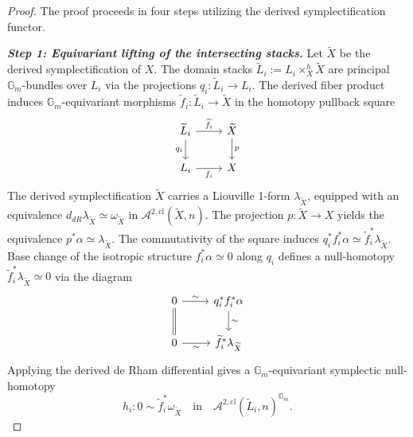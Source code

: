 \documentclass[reqno]{amsart}
\theoremstyle{definition}
\theoremstyle{remark}
\newcommand{\Gm}{\mathbb{G}_m}
\newcommand{\Acl}{\mathcal{A}^{2, \mathrm{cl}}}
\begin{document}
{\begin{proof}
  The proof proceeds in four steps utilizing the derived symplectification functor.

  \vspace{5pt}

  \textbf{\textit{Step 1: Equivariant lifting of the intersecting stacks.}}
  Let $\widetilde{X}$ be the derived symplectification of $X$. The domain stacks $\widetilde{L}_i := L_i \times_X^h \widetilde{X}$ are principal $\Gm$-bundles over $L_i$ via the projections $q_i \colon \widetilde{L}_i \to L_i$. The derived fiber product induces $\Gm$-equivariant morphisms $\widetilde{f}_i \colon \widetilde{L}_i \to \widetilde{X}$ in the homotopy pullback square
  \[
    \begin{tikzcd}
      \widetilde{L}_i \arrow[r, "\widetilde{f}_i"] \arrow[d, "q_i"'] &
      \widetilde{X} \arrow[d, "p"] \\
      L_i \arrow[r, "f_i"'] & X
    \end{tikzcd}
  \]
The derived symplectification $\widetilde{X}$ carries a Liouville 1-form $\lambda_{\widetilde{X}}$, equipped with an equivalence $d_{dR}\lambda_{\widetilde{X}} \simeq \omega_{\widetilde{X}}$ in $\Acl(\widetilde{X}, n)$. The projection $p \colon \widetilde{X} \to X$ yields the equivalence $p^*\alpha \simeq \lambda_{\widetilde{X}}$. 
The commutativity of the square induces $q_i^* f_i^* \alpha \simeq \widetilde{f}_i^* \lambda_{\widetilde{X}}$. Base change of the isotropic structure $f_i^*\alpha \simeq 0$ along $q_i$ defines a null-homotopy $\widetilde{f}_i^*\lambda_{\widetilde{X}} \simeq 0$ via the diagram
  \[
    \begin{tikzcd}
      0 \arrow[r, "\sim"] \arrow[d, equal] & q_i^* f_i^* \alpha
      \arrow[d, "\sim"] \\
      0 \arrow[r, "\sim"'] & \widetilde{f}_i^* \lambda_{\widetilde{X}}
    \end{tikzcd}
  \]
  Applying the derived de Rham differential gives a $\Gm$-equivariant symplectic null-homotopy
  \begin{equation*}
    h_i \colon 0 \sim \widetilde{f}_i^*\omega_{\widetilde{X}} \quad \text{in} \quad \Acl(\widetilde{L}_i, n)^{\Gm}.
  \end{equation*}


\end{proof}}
\end{document}
